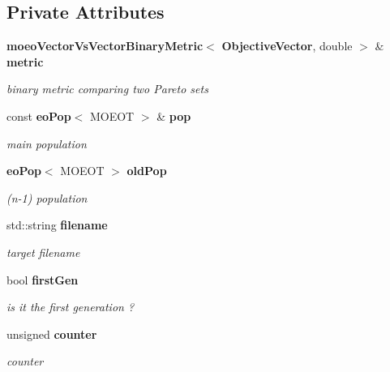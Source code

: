 \subsection*{Private Attributes}
\begin{CompactItemize}
\item 
{\bf moeo\-Vector\-Vs\-Vector\-Binary\-Metric}$<$ {\bf Objective\-Vector}, double $>$ \& {\bf metric}\label{classmoeoBinaryMetricSavingUpdater_d1c66d6d179aff03d6949f4f76d3237c}

\begin{CompactList}\small\item\em binary metric comparing two Pareto sets \item\end{CompactList}\item 
const {\bf eo\-Pop}$<$ MOEOT $>$ \& {\bf pop}\label{classmoeoBinaryMetricSavingUpdater_79eea0916733568929ea9c0758ffe8fa}

\begin{CompactList}\small\item\em main population \item\end{CompactList}\item 
{\bf eo\-Pop}$<$ MOEOT $>$ {\bf old\-Pop}\label{classmoeoBinaryMetricSavingUpdater_0461af7e569921fec49538ff8fa998d4}

\begin{CompactList}\small\item\em (n-1) population \item\end{CompactList}\item 
std::string {\bf filename}\label{classmoeoBinaryMetricSavingUpdater_6d280c180de7bab1e18ab2bb39a0e184}

\begin{CompactList}\small\item\em target filename \item\end{CompactList}\item 
bool {\bf first\-Gen}\label{classmoeoBinaryMetricSavingUpdater_9bfa927499265f53f2b25afd2cd3c94f}

\begin{CompactList}\small\item\em is it the first generation ? \item\end{CompactList}\item 
unsigned {\bf counter}\label{classmoeoBinaryMetricSavingUpdater_02339c6081864e43667860445d96a909}

\begin{CompactList}\small\item\em counter \item\end{CompactList}\end{CompactItemize}


